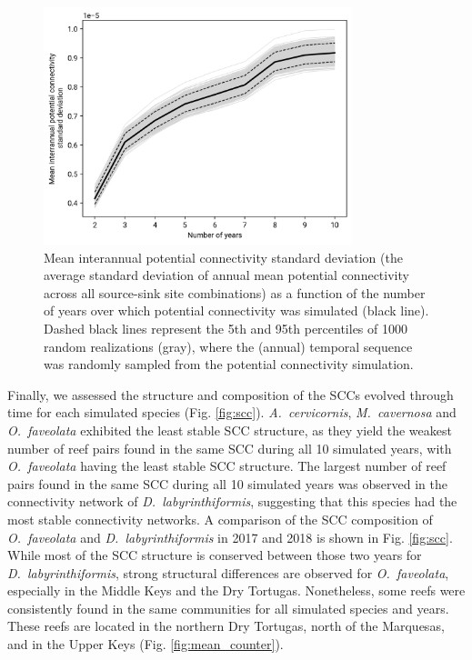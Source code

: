 \documentclass[preprint,12pt,authoryear]{elsarticle}
\begin{document}
\begin{figure}
    \centering
    \includegraphics[width=0.8\textwidth]{figures/fig_cm_std.png}
    \caption{Mean interannual potential connectivity standard deviation (the average standard deviation of annual mean potential connectivity across all source-sink site combinations) as a function of the number of years over which potential connectivity was simulated (black line). Dashed black lines represent the 5th and 95th percentiles of 1000 random realizations (gray), where the (annual) temporal sequence was randomly sampled from the potential connectivity simulation.}\label{fig:saturation}
\end{figure}

Finally, we assessed the structure and composition of the SCCs evolved through time for each simulated species (Fig. \ref{fig:scc}). \textit{A.~cervicornis}, \textit{M.~cavernosa} and \textit{O.~faveolata} exhibited the least stable SCC structure, as they yield the weakest number of reef pairs found in the same SCC during all 10 simulated years, with \textit{O.~faveolata} having the least stable SCC structure. The largest number of reef pairs found in the same SCC during all 10 simulated years was observed in the connectivity network of \textit{D.~labyrinthiformis}, suggesting that this species had the most stable connectivity networks. A comparison of the SCC composition of \textit{O.~faveolata} and \textit{D.~labyrinthiformis} in 2017 and 2018 is shown in Fig. \ref{fig:scc}. While most of the SCC structure is conserved between those two years for \textit{D.~labyrinthiformis}, strong structural differences are observed for \textit{O.~faveolata}, especially in the Middle Keys and the Dry Tortugas. Nonetheless, some reefs were consistently found in the same communities for all simulated species and years. These reefs are located in the northern Dry Tortugas, north of the Marquesas, and in the Upper Keys (Fig. \ref{fig:mean_counter}).
\end{document}
